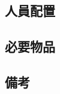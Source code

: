 \documentclass[12pt]{jarticle}
\begin{document}
\subsection{人員配置}

\subsection{必要物品}

\subsection{備考}
\end{document}
